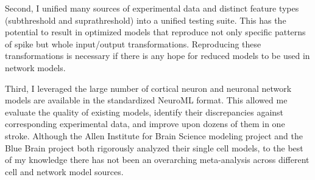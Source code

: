 Second, I unified many sources of experimental data and distinct feature types (subthreshold and suprathreshold) into a unified testing suite.
This has the potential to result in optimized models that reproduce not only specific patterns of spike but whole input/output transformations.
Reproducing these transformations is necessary if there is any hope for reduced models to be used in network models.

Third, I leveraged the large number of cortical neuron and neuronal network models are available in the standardized NeuroML format. This allowed me evaluate the quality of existing models, identify their discrepancies against corresponding experimental data, and improve upon dozens of them in one stroke.
Although the Allen Institute for Brain Science modeling project and the Blue Brain project both rigorously analyzed their single cell models, to the best of my knowledge there has not been an overarching meta-analysis across different cell and network model sources.





